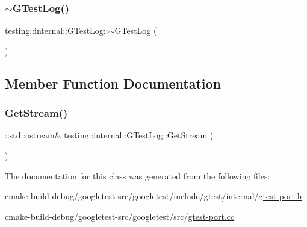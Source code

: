 \mbox{\label{classtesting_1_1internal_1_1GTestLog_a978a099703bbaa0f380216e8d7ee03d3}} 
\subsubsection{\texorpdfstring{$\sim$GTestLog()}{~GTestLog()}}
{\footnotesize\ttfamily testing\+::internal\+::\+G\+Test\+Log\+::$\sim$\+G\+Test\+Log (\begin{DoxyParamCaption}{ }\end{DoxyParamCaption})}



\subsection{Member Function Documentation}
\mbox{\label{classtesting_1_1internal_1_1GTestLog_aebb92e67d98eca69f0347d5121dab27a}} 
\subsubsection{\texorpdfstring{GetStream()}{GetStream()}}
{\footnotesize\ttfamily \+::std\+::ostream\& testing\+::internal\+::\+G\+Test\+Log\+::\+Get\+Stream (\begin{DoxyParamCaption}{ }\end{DoxyParamCaption})\hspace{0.3cm}{\ttfamily [inline]}}



The documentation for this class was generated from the following files\+:\begin{DoxyCompactItemize}
\item 
cmake-\/build-\/debug/googletest-\/src/googletest/include/gtest/internal/\mbox{\hyperlink{gtest-port_8h}{gtest-\/port.\+h}}\item 
cmake-\/build-\/debug/googletest-\/src/googletest/src/\mbox{\hyperlink{gtest-port_8cc}{gtest-\/port.\+cc}}\end{DoxyCompactItemize}
